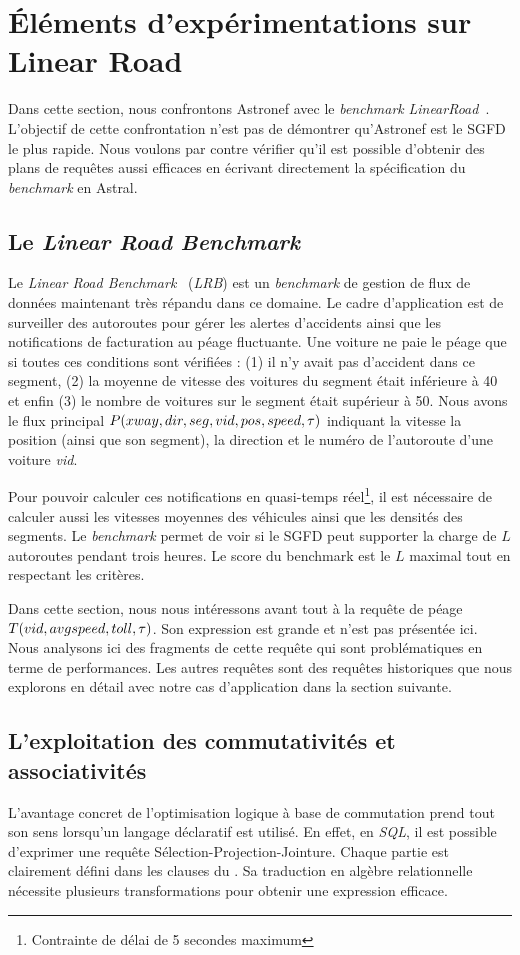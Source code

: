 \section{Éléments d'expérimentations sur Linear Road}\label{sec:valid:perfs:flux}
Dans cette section, nous confrontons Astronef avec le \textit{benchmark} \textit{LinearRoad}~\cite{Arasu:lrb}. L'objectif de cette confrontation n'est pas de démontrer qu'Astronef est le SGFD le plus rapide. Nous voulons par contre vérifier qu'il est possible d'obtenir des plans de requêtes aussi efficaces en écrivant directement la spécification du \textit{benchmark} en Astral.

\subsection{Le \textit{Linear Road Benchmark}}
Le \textit{Linear Road Benchmark}~\cite{Arasu:lrb} (\textit{LRB}) est un \textit{benchmark} de gestion de flux de données maintenant très répandu dans ce domaine. Le cadre d'application est de surveiller des autoroutes pour gérer les alertes d'accidents ainsi que les notifications de facturation au péage fluctuante. Une voiture ne paie le péage que si toutes ces conditions sont vérifiées : (1) il n'y avait pas d'accident dans ce segment, (2) la moyenne de vitesse des voitures du segment était inférieure à 40 et enfin (3) le nombre de voitures sur le segment était supérieur à 50. Nous avons le flux principal $P(xway, dir, seg, vid, pos, speed, \tau)$ indiquant la vitesse la position (ainsi que son segment), la direction et le numéro de l'autoroute d'une voiture \textit{vid}.

Pour pouvoir calculer ces notifications en quasi-temps réel\footnote{Contrainte de délai de 5 secondes maximum}, il est nécessaire de calculer aussi les vitesses moyennes des véhicules ainsi que les densités des segments. Le \textit{benchmark} permet de voir si le SGFD peut supporter la charge de $L$ autoroutes pendant trois heures. Le score du benchmark est le $L$ maximal tout en respectant les critères.

Dans cette section, nous nous intéressons avant tout à la requête de péage $T(vid,avgspeed,toll,\tau)$. Son expression est grande et n'est pas présentée ici. Nous analysons ici des fragments de cette requête qui sont problématiques en terme de performances. Les autres requêtes sont des requêtes historiques que nous explorons en détail avec notre cas d'application dans la section suivante.

\subsection{L'exploitation des commutativités et associativités}
L'avantage concret de l'optimisation logique à base de commutation prend tout son sens lorsqu'un langage déclaratif est utilisé. En effet, en \textit{SQL}, il est possible d'exprimer une requête Sélection-Projection-Jointure. Chaque partie est clairement défini dans les clauses du . Sa traduction en algèbre relationnelle nécessite plusieurs transformations pour obtenir une expression efficace.


